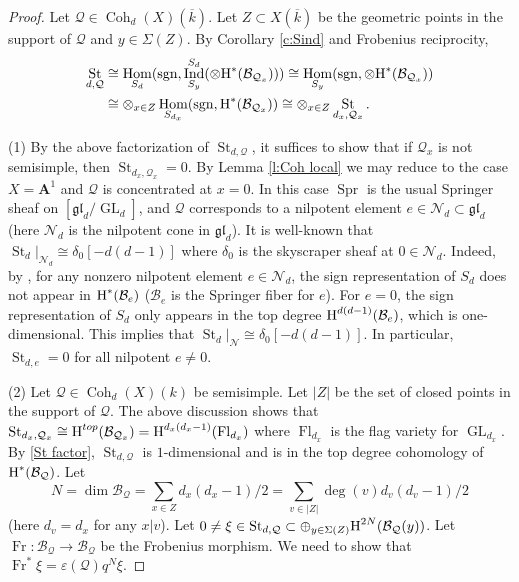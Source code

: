 \documentclass[reqno]{amsart}
\numberwithin{equation}{section}
\newcommand{\wt}[1]{\widetilde{#1}}
\newcommand{\sgn}{\operatorname{sgn}}
\newcommand{\A}{\mathbf{A}}
\newcommand{\scr}[1]{\mathscr{#1}}
\DeclareMathOperator{\GL}{GL}
\DeclareMathOperator{\Frob}{Fr}
\DeclareMathOperator{\Hom}{Hom}
\DeclareMathOperator{\Ind}{Ind}
\DeclareMathOperator{\Fl}{Fl}
\DeclareMathOperator{\Coh}{Coh}
\DeclareMathOperator{\St}{St}
\DeclareMathOperator{\Spr}{Spr}
\newcommand{\ov}{\overline}
\newcommand\op{\oplus}
\newcommand\ot{\otimes}
\newcommand{\cohog}[2]{\textup{H}^{#1}({#2})}     %
\newcommand\gl{\mathfrak{gl}}
\renewcommand\d\delta
\newcommand{\e}{\varepsilon}
\newcommand\cB{\mathcal{B}}
\newcommand\cQ{\mathcal{Q}}
\theoremstyle{remark}
\numberwithin{equation}{section}
\begin{document}
\begin{proof}
Let $\cQ\in \Coh_{d}(X)(\ov k)$. Let $Z\subset X(\ov k)$ be the geometric points in the support of $\cQ$ and $y\in \Sigma(Z)$. By Corollary \ref{c:Sind} and Frobenius reciprocity,
\begin{align}\label{St factor}
\St_{d,\cQ} &\cong \Hom_{S_{d}}(\sgn, \Ind^{S_{d}}_{S_{y}}(\ot \cohog{*}{\cB_{\cQ_{x}}}))\cong \Hom_{S_{y}}(\sgn, \ot \cohog{*}{\cB_{\cQ_{x}}}) \nonumber \\
&\cong  \ot_{x\in Z}\Hom_{S_{d_{x}}}(\sgn,\cohog{*}{\cB_{\cQ_{x}}})\cong \ot_{x\in Z}\St_{d_{x}, \cQ_{x}}.
\end{align}

(1) By the above factorization of $\St_{d,\cQ}$, it suffices to show that if $\cQ_{x}$ is not semisimple, then $\St_{d_{x}, \cQ_{x}}=0$. By Lemma \ref{l:Coh local} we may reduce to the case $X=\A^{1}$ and $\cQ$ is concentrated at $x=0$. In this case $\Spr$ is the usual Springer sheaf on $[\gl_{d}/\GL_{d}]$, and $\cQ$ corresponds to a nilpotent element $e\in \scr{N}_{d}\subset \gl_{d}$ (here $\scr{N}_d$ is the nilpotent cone in $\gl_d$). It is well-known that $\St_{d}|_{\scr{N}_{d}}\cong \d_{0}[-d(d-1)]$ where $\d_{0}$ is the skyscraper sheaf at $0\in \scr{N}_{d}$. Indeed, by \cite[\S3.4, Corollary (b)]{BM}, for any nonzero nilpotent element $e\in \scr{N}_{d}$, the sign representation of $S_{d}$ does not appear in $\cohog{*}{\cB_{e}}$ ($\cB_{e}$ is the Springer fiber for $e$). For $e=0$, the sign representation of $S_{d}$ only appears in the top degree $\cohog{d(d-1)}{\cB_{e}}$, which is one-dimensional. This implies that $\St_{d}|_{\scr{N}}\cong \d_{0}[-d(d-1)]$.
In particular, $\St_{d,e}=0$ for all nilpotent $e\ne 0$.

(2) Let $\cQ\in \Coh_{d}(X)(k)$ be semisimple. Let $|Z|$ be the set of closed points in the support of $\cQ$. The above discussion shows that $\St_{d_{x},\cQ_{x}}\cong \cohog{top}{\cB_{\cQ_{x}}} =\cohog{d_{x}(d_{x}-1)}{\Fl_{d_{x}}}$ where $\Fl_{d_{x}}$ is the flag variety for $\GL_{d_x}$. By \eqref{St factor}, $\St_{d,\cQ}$ is $1$-dimensional and is in the top degree cohomology of $\cohog{*}{\cB_{\cQ}}$. Let 
\[
N=\dim \cB_{\cQ}=\sum_{x\in Z}d_{x}(d_{x}-1)/2=\sum_{v\in|Z|}\deg(v)d_{v}(d_{v}-1)/2
\]
(here $d_{v}=d_{x}$ for any $x|v$). Let $0\ne \xi\in \St_{d,\cQ}\subset \op_{y\in\Sigma(Z)}\cohog{2N}{\cB_{\cQ}(y)}$. Let $\Frob:\cB_{\cQ}\to\cB_{\cQ}$  be the Frobenius morphism. We need to show that $\Frob^{*}\xi=\e(\cQ)q^{N}\xi$. 


\end{proof}
\end{document}
